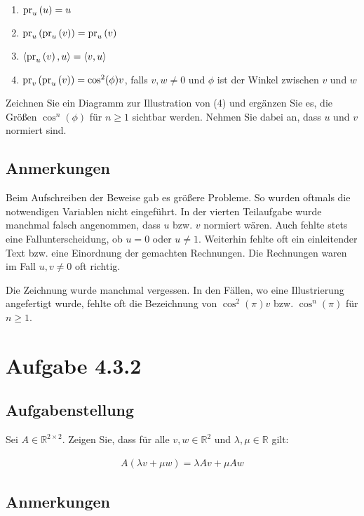 \documentclass[a4paper]{article}
\newcommand*{\R}{\mathbb R}
\begin{document}
\begin{enumerate}
  \item $\operatorname{pr}_{u}\left( u \right) = u$
  \item $\operatorname{pr}_{u}\left( \operatorname{pr}_{u}\left( v \right) \right) = \operatorname{pr}_{u}\left( v \right)$
  \item $\langle {\operatorname{pr}_{u}\left( v \right),u} \rangle = \langle {v,u} \rangle$
  \item $\operatorname{pr}_{v}\left( \operatorname{pr}_{u}\left( v \right) \right) = \cos^2(\phi) v$, falls $v,w\neq 0$ und $\phi$ ist der Winkel zwischen $v$ und $w$
\end{enumerate}

Zeichnen Sie ein Diagramm zur Illustration von (4) und ergänzen Sie es, die Größen $\cos^n(\phi)$ für $n\ge 1$ sichtbar werden. Nehmen Sie dabei an, dass $u$ und $v$ normiert sind.

\subsection{Anmerkungen}

Beim Aufschreiben der Beweise gab es größere Probleme. So wurden oftmals die notwendigen Variablen nicht eingeführt. In der vierten Teilaufgabe wurde manchmal falsch angenommen, dass $u$ bzw. $v$ normiert wären. Auch fehlte stets eine Fallunterscheidung, ob $u=0$ oder $u\neq 1$. Weiterhin fehlte oft ein einleitender Text bzw. eine Einordnung der gemachten Rechnungen. Die Rechnungen waren im Fall $u,v\neq 0$ oft richtig.

Die Zeichnung wurde manchmal vergessen. In den Fällen, wo eine Illustrierung angefertigt wurde, fehlte oft die Bezeichnung von $\cos^2(\pi)v$ bzw. $\cos^n(\pi)$ für $n\ge 1$.

\section{Aufgabe 4.3.2}

\subsection{Aufgabenstellung}

Sei $A\in\R^{2\times 2}$. Zeigen Sie, dass für alle $v,w\in\R^2$ und $\lambda,\mu\in\R$ gilt:

\begin{align}
  A(\lambda v + \mu w) = \lambda A v + \mu A w
\end{align}

\subsection{Anmerkungen}
\end{document}
